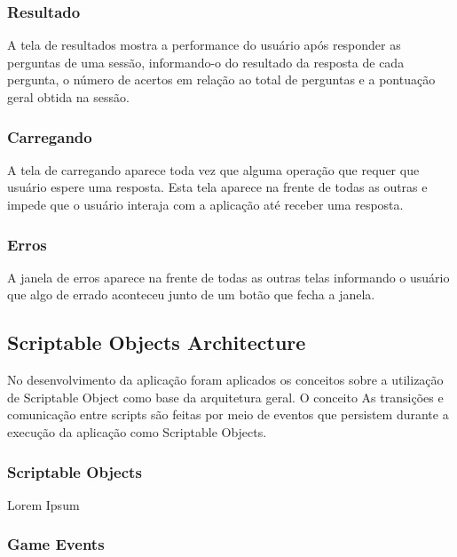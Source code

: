\subsubsection{Resultado}
\label{subsubsec:resultado}

A tela de resultados mostra a performance do usuário após responder as perguntas de uma sessão, informando-o do resultado da resposta de cada pergunta, o número de acertos em relação ao total de perguntas e a pontuação geral obtida na sessão.


\subsubsection{Carregando}
\label{subsubsec:carregando}

A tela de carregando aparece toda vez que alguma operação que requer que usuário espere uma resposta. Esta tela aparece na frente de todas as outras e impede que o usuário interaja com a aplicação até receber uma resposta.


\subsubsection{Erros}
\label{subsubsec:erros}

A janela de erros aparece na frente de todas as outras telas informando o usuário que algo de errado aconteceu junto de um botão que fecha a janela.

\subsection{Scriptable Objects Architecture}
\label{subsec:scriptableobjectsarch}

No desenvolvimento da aplicação foram aplicados os conceitos sobre a utilização de Scriptable Object como base da arquitetura geral. O conceito
As transições e comunicação entre scripts são feitas por meio de eventos que persistem durante a execução da aplicação como Scriptable Objects.

\subsubsection{Scriptable Objects}
\label{subsubsec:scriptableobjects}

Lorem Ipsum


\subsubsection{Game Events}
\label{subsubsec:gameevents}

